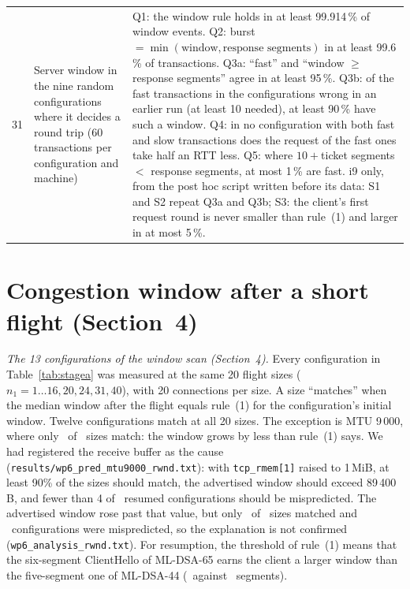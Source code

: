 \documentclass[9pt]{article}
\begin{document}
\begin{footnotesize}
\begin{longtable}{@{}p{}p{}p{}@{}}
31 & Server window in the nine random configurations where it decides a round trip (60 transactions per configuration and machine) & Q1: the window rule holds in at least 99.914\,\% of window events. Q2: burst $=\min(\mbox{window},\mbox{response segments})$ in at least 99.6\,\% of transactions. Q3a: ``fast'' and ``window $\ge$ response segments'' agree in at least 95\,\%. Q3b: of the fast transactions in the configurations wrong in an earlier run (at least 10 needed), at least 90\,\% have such a window. Q4: in no configuration with both fast and slow transactions does the request of the fast ones take half an RTT less. Q5: where $10+{}$ticket segments $<$ response segments, at most 1\,\% are fast. i9 only, from the post hoc script written before its data: S1 and S2 repeat Q3a and Q3b; S3: the client's first request round is never smaller than rule~(1) and larger in at most 5\,\%.\\
\end{longtable}
\end{footnotesize}

\section*{Congestion window after a short flight (Section~4)}
\emph{The 13 configurations of the window scan (Section~4).} Every configuration in Table~\ref{tab:stagea} was measured at the same 20 flight sizes ($n_1=1\dots16,20,24,31,40$), with 20 connections per size. A size ``matches'' when the median window after the flight equals rule~(1) for the configuration's initial window. Twelve configurations match at all 20 sizes. The exception is MTU 9\,000, where only \NineRwndDefOk\ of \NineRwndDefTot\ sizes match: the window grows by less than rule~(1) says. We had registered the receive buffer as the cause (\texttt{results/wp6\_pred\_mtu9000\_rwnd.txt}): with \texttt{tcp\_rmem[1]} raised to 1\,MiB, at least 90\% of the sizes should match, the advertised window should exceed 89\,400\,B, and fewer than 4 of \NineLargeN\ resumed configurations should be mispredicted. The advertised window rose past that value, but only \NineRwndLargeOk\ of \NineRwndLargeTot\ sizes matched and \NineLargeWrong\ configurations were mispredicted, so the explanation is not confirmed (\texttt{wp6\_analysis\_rwnd.txt}). For resumption, the threshold of rule~(1) means that the six-segment ClientHello of ML-DSA-65 earns the client a larger window than the five-segment one of ML-DSA-44 (\WSix\ against \WFive\ segments).
\end{document}
